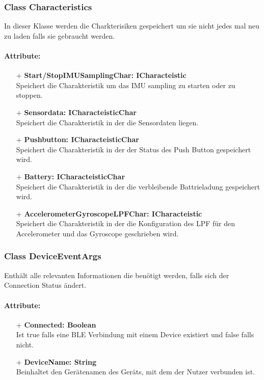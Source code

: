 \documentclass[a4paper,12pt]{article}
\begin{document}
\subsubsection{Class Characteristics}
In dieser Klasse werden die Charkterisiken gespeichert um sie nicht jedes mal neu zu laden falls sie gebraucht werden.

\paragraph{Attribute:}
\begin{itemize}
	\item[+] \textbf{Start/StopIMUSamplingChar: ICharacteistic}\\Speichert die Charakteristik um das IMU sampling zu starten oder zu stoppen.
	\item[+] \textbf{Sensordata: ICharacteisticChar}\\Speichert die Charakteristik in der die Sensordaten liegen.
	\item[+] \textbf{Pushbutton: ICharacteisticChar}\\Speichert die Charakteristik in der der Status des Push Button gespeichert wird.
	\item[+] \textbf{Battery: ICharacteisticChar}\\Speichert die Charakteristik in der die verbleibende Battrieladung gespeichert wird.
	\item[+] \textbf{AccelerometerGyroscopeLPFChar: ICharacteistic}\\Speichert die Charakteristik in der die Konfiguration des LPF für den Accelerometer und das Gyroscope geschrieben wird.
\end{itemize}


\subsubsection{Class DeviceEventArgs}
Enthält alle relevanten Informationen die benötigt werden, falls sich der Connection Status ändert.

\paragraph{Attribute:}
\begin{itemize}
	\item[+] \textbf{Connected: Boolean}\\Ist true falls eine BLE Verbindung mit einem Device existiert und false falls nicht.
	\item[+] \textbf{DeviceName: String}\\Beinhaltet den Gerätenamen des Geräts, mit dem der Nutzer verbunden ist. 
\end{itemize}
\end{document}
